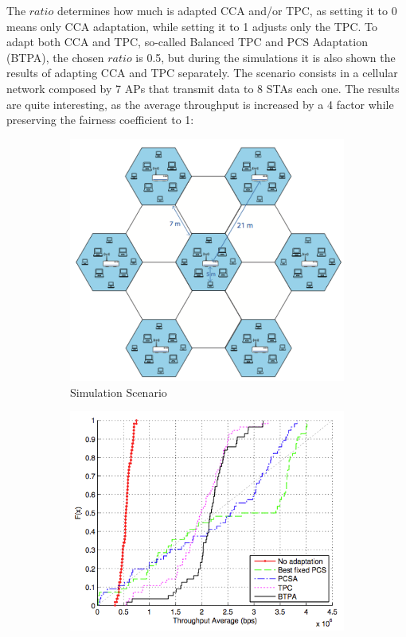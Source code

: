 \documentclass[12pt, a4paper,twoside]{tesi_upf}
\begin{document}
			The $ratio$ determines how much is adapted CCA and/or TPC, as setting it to 0 means only CCA adaptation, while setting it to 1 adjusts only the TPC. To adapt both CCA and TPC, so-called Balanced TPC and PCS Adaptation (BTPA), the chosen $ratio$ is 0.5, but during the simulations it is also shown the results of adapting CCA and TPC separately. The scenario consists in a cellular network composed by 7 APs that transmit data to 8 STAs each one.	The results are quite interesting, as the average throughput is increased by a 4 factor while preserving the fairness coefficient to 1:	
			\begin{figure}[t!]
				\centering
				\begin{subfigure}[b]{0.3\textwidth}
					\includegraphics[width=\textwidth]{images/scenario_tpc_cca_adaptation_cellular}
					\caption{Simulation Scenario}
					\label{fig:jamil_et_al_scenario}
				\end{subfigure}
				\begin{subfigure}[b]{0.3\textwidth}
					\includegraphics[width=\textwidth]{images/results_tpc_cca_adaptation_simple}

\end{subfigure}
\end{figure}
\end{document}
